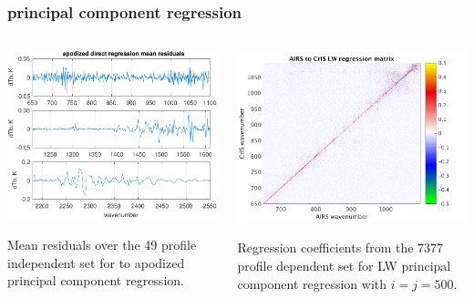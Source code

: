 \documentclass[10pt]{beamer}
\begin{document}
\begin{frame}
\frametitle{principal component regression}
\begin{columns}[t]
\begin{column}{0.5\textwidth}
  \begin{centering}
  \includegraphics[width=\textwidth]{figures/ap_pc_regr.pdf}
  \end{centering}\vspace{3mm}
  Mean residuals over the 49 profile independent set for {\airs} to
  apodized {\cris} principal component regression.

\end{column}
\begin{column}{0.5\textwidth}  
  \begin{centering}
  \includegraphics[width=\textwidth]{figures/LW_pc_regr_mat.png}
  \end{centering}\vspace{3mm}
  Regression coefficients from the 7377 profile dependent set for
  LW principal component regression with $i = j = 500$.
 
\end{column}
\end{columns}
\end{frame}
\end{document}
